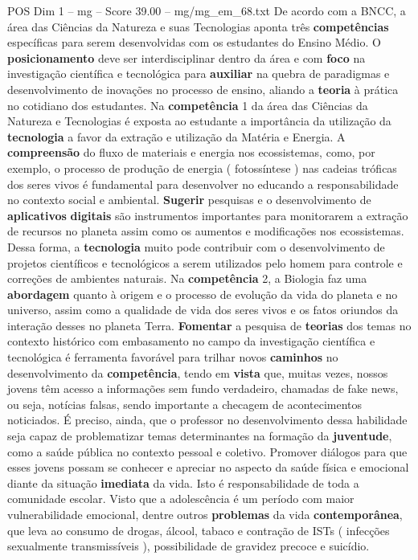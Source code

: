 \begin{textsample}{POS Dim 1 – mg – Score 39.00 – mg/mg\_em\_68.txt}
De acordo com a BNCC, a área das Ciências da Natureza e suas Tecnologias aponta três \textbf{competências} específicas para serem desenvolvidas com os estudantes do Ensino Médio.
O \textbf{posicionamento} deve ser interdisciplinar dentro da área e com \textbf{foco} na investigação científica e tecnológica para \textbf{auxiliar} na quebra de paradigmas e desenvolvimento de inovações no processo de ensino, aliando a \textbf{teoria} à prática no cotidiano dos estudantes.
Na \textbf{competência} 1 da área das Ciências da Natureza e Tecnologias é exposta ao estudante a importância da utilização da \textbf{tecnologia} a favor da extração e utilização da Matéria e Energia.
A \textbf{compreensão} do fluxo de materiais e energia nos ecossistemas, como, por exemplo, o processo de produção de energia ( fotossíntese ) nas cadeias tróficas dos seres vivos é fundamental para desenvolver no educando a responsabilidade no contexto social e ambiental. \textbf{Sugerir} pesquisas e o desenvolvimento de \textbf{aplicativos} \textbf{digitais} são instrumentos importantes para monitorarem a extração de recursos no planeta assim como os aumentos e modificações nos ecossistemas.
Dessa forma, a \textbf{tecnologia} muito pode contribuir com o desenvolvimento de projetos científicos e tecnológicos a serem utilizados pelo homem para controle e correções de ambientes naturais.
Na \textbf{competência} 2, a Biologia faz uma \textbf{abordagem} quanto à origem e o processo de evolução da vida do planeta e no universo, assim como a qualidade de vida dos seres vivos e os fatos oriundos da interação desses no planeta Terra. \textbf{Fomentar} a pesquisa de \textbf{teorias} dos temas no contexto histórico com embasamento no campo da investigação científica e tecnológica é ferramenta favorável para trilhar novos \textbf{caminhos} no desenvolvimento da \textbf{competência}, tendo em \textbf{vista} que, muitas vezes, nossos jovens têm acesso a informações sem fundo verdadeiro, chamadas de fake news, ou seja, notícias falsas, sendo importante a checagem de acontecimentos noticiados.
É preciso, ainda, que o professor no desenvolvimento dessa habilidade seja capaz de problematizar temas determinantes na formação da \textbf{juventude}, como a saúde pública no contexto pessoal e coletivo.
Promover diálogos para que esses jovens possam se conhecer e apreciar no aspecto da saúde física e emocional diante da situação \textbf{imediata} da vida.
Isto é responsabilidade de toda a comunidade escolar.
Visto que a adolescência é um período com maior vulnerabilidade emocional, dentre outros \textbf{problemas} da vida \textbf{contemporânea}, que leva ao consumo de drogas, álcool, tabaco e contração de ISTs ( infecções sexualmente transmissíveis ), possibilidade de gravidez precoce e suicídio.

\end{textsample}
